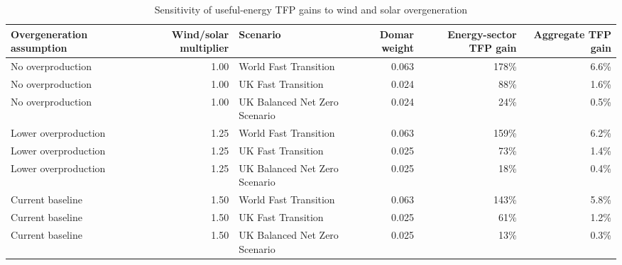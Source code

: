 
\begin{longtable}[t]{lrlrrr}
\caption{\label{tab:tab_main_overgeneration_sensitivity}Sensitivity of useful-energy TFP gains to wind and solar overgeneration}\\
\toprule
Overgeneration assumption & Wind/solar multiplier & Scenario & Domar weight & Energy-sector TFP gain & Aggregate TFP gain\\
\midrule
No overproduction & 1.00 & World Fast Transition & 0.063 & 178\% & 6.6\%\\
No overproduction & 1.00 & UK Fast Transition & 0.024 & 88\% & 1.6\%\\
No overproduction & 1.00 & UK Balanced Net Zero Scenario & 0.024 & 24\% & 0.5\%\\
Lower overproduction & 1.25 & World Fast Transition & 0.063 & 159\% & 6.2\%\\
Lower overproduction & 1.25 & UK Fast Transition & 0.025 & 73\% & 1.4\%\\
\addlinespace
Lower overproduction & 1.25 & UK Balanced Net Zero Scenario & 0.025 & 18\% & 0.4\%\\
Current baseline & 1.50 & World Fast Transition & 0.063 & 143\% & 5.8\%\\
Current baseline & 1.50 & UK Fast Transition & 0.025 & 61\% & 1.2\%\\
Current baseline & 1.50 & UK Balanced Net Zero Scenario & 0.025 & 13\% & 0.3\%\\
\bottomrule
\end{longtable}
